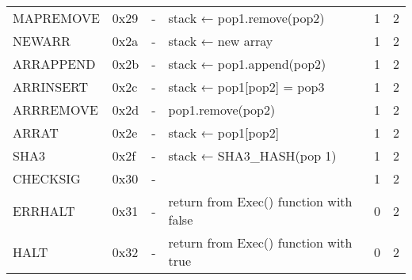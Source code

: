 \begin{longtable}[c]{L{2.5cm} L{1cm} L{3cm} L{5.5cm} R{0.8cm} R{1cm} }
MAPREMOVE & 0x29   & -                                                                                                        & stack ← pop1.remove(pop2)                                                                       & 1         & 2          \\
NEWARR    & 0x2a   & -                                                                                                        & stack ← new array                                                                                           & 1         & 2          \\
ARRAPPEND & 0x2b   & -                                                                                                        & stack ← pop1.append(pop2)                                                                            & 1         & 2          \\
ARRINSERT & 0x2c   & -                                                                                                        & stack ← pop1[pop2] = pop3                                                                                & 1         & 2          \\
ARRREMOVE & 0x2d   & -                                                                                                        & pop1.remove(pop2)                                                                                            & 1         & 2          \\
ARRAT     & 0x2e   & -                                                                                                        & stack ← pop1[pop2] & 1         & 2          \\
SHA3      & 0x2f   & -                                                                                                        & stack ← SHA3\_HASH(pop 1)                                                                                   & 1         & 2          \\
CHECKSIG  & 0x30   & -                                                                                                        &                                                                                                             & 1         & 2          \\
ERRHALT   & 0x31   & -                                                                                                        & return from Exec() function with false                                                                      & 0         & 2          \\
HALT      & 0x32   & -                                                                                                        & return from Exec() function with true                                                                       & 0         & 2          \\* \bottomrule
\end{longtable}